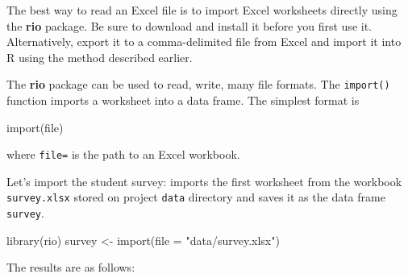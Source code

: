\documentclass[
]{book}
\newenvironment{Shaded}{\begin{snugshade}}{\end{snugshade}}
\newcommand{\AttributeTok}[1]{\textcolor[rgb]{0.77,0.63,0.00}{#1}}
\newcommand{\FunctionTok}[1]{\textcolor[rgb]{0.00,0.00,0.00}{#1}}
\newcommand{\NormalTok}[1]{#1}
\newcommand{\OtherTok}[1]{\textcolor[rgb]{0.56,0.35,0.01}{#1}}
\newcommand{\StringTok}[1]{\textcolor[rgb]{0.31,0.60,0.02}{#1}}
\begin{document}
The best way to read an Excel file is to import Excel worksheets directly using the \textbf{rio} package. Be sure to download and install it before you first use it. Alternatively, export it to a comma-delimited file from Excel and import it into R using the method described earlier.

The \textbf{rio} package can be used to read, write, many file formats. The \texttt{import()} function imports a worksheet into a data frame. The simplest format is

\begin{Shaded}
\begin{Highlighting}[]
\FunctionTok{import}\NormalTok{(file)}
\end{Highlighting}
\end{Shaded}

where \texttt{file=} is the path to an Excel workbook.

Let's import the student survey: imports the first worksheet from the workbook \texttt{survey.xlsx} stored on project \texttt{data} directory and saves it as the data frame \texttt{survey}.

\begin{Shaded}
\begin{Highlighting}[]
\FunctionTok{library}\NormalTok{(rio)}
\NormalTok{survey }\OtherTok{\textless{}{-}} \FunctionTok{import}\NormalTok{(}\AttributeTok{file =} \StringTok{"data/survey.xlsx"}\NormalTok{)}
\end{Highlighting}
\end{Shaded}

The results are as follows:
\end{document}
